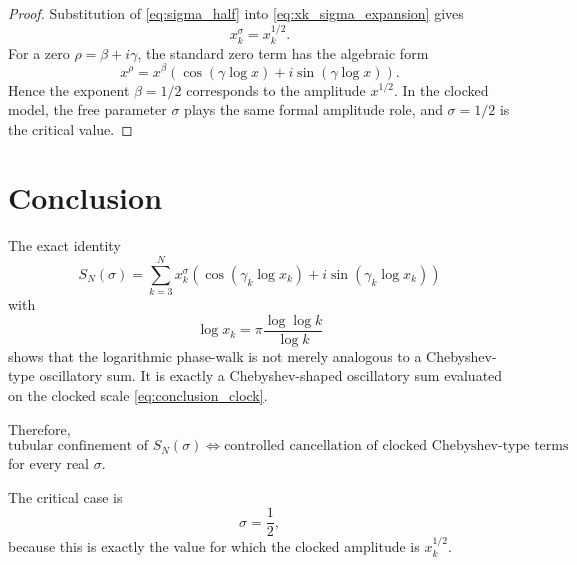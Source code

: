 \documentclass[11pt]{amsart}
\numberwithin{equation}{section}
\theoremstyle{plain}
\theoremstyle{definition}
\theoremstyle{remark}
\begin{document}
\begin{proof}
Substitution of \eqref{eq:sigma_half} into \eqref{eq:xk_sigma_expansion}
gives
\begin{equation}
x_k^\sigma=x_k^{1/2}.
\label{eq:critical_amplitude_substitution}
\end{equation}
For a zero $\rho=\beta+i\gamma$, the standard zero term has the
algebraic form
\begin{equation}
x^\rho
=
x^\beta
\left(
\cos(\gamma\log x)
+
i\sin(\gamma\log x)
\right).
\label{eq:xrho_decomposition}
\end{equation}
Hence the exponent $\beta=1/2$ corresponds to the amplitude $x^{1/2}$.
In the clocked model, the free parameter $\sigma$ plays the same formal
amplitude role, and $\sigma=1/2$ is the critical value.
\end{proof}

\section{Conclusion}
\label{sec:conclusion}

The exact identity
\begin{equation}
S_N(\sigma)
=
\sum_{k=3}^{N}
x_k^\sigma
\left(
\cos(\gamma_k\log x_k)
+
i\sin(\gamma_k\log x_k)
\right)
\label{eq:conclusion_identity}
\end{equation}
with
\begin{equation}
\log x_k
=
\pi\frac{\log\log k}{\log k}
\label{eq:conclusion_clock}
\end{equation}
shows that the logarithmic phase-walk is not merely analogous to a
Chebyshev-type oscillatory sum. It is exactly a Chebyshev-shaped
oscillatory sum evaluated on the clocked scale \eqref{eq:conclusion_clock}.

Therefore,
\begin{equation}
\boxed{
\text{tubular confinement of }S_N(\sigma)
\Longleftrightarrow
\text{controlled cancellation of clocked Chebyshev-type terms}
}
\label{eq:final_equivalence}
\end{equation}
for every real $\sigma$.

The critical case is
\begin{equation}
\boxed{
\sigma=\frac12,
}
\label{eq:final_critical_sigma}
\end{equation}
because this is exactly the value for which the clocked amplitude is
$x_k^{1/2}$.
\end{document}
